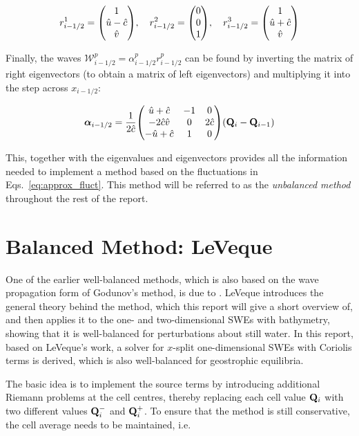 \begin{align}
  r_{i-1/2}^1 = \mqty(1 \\ \hat u - \hat c \\ \hat v) \qc
  r_{i-1/2}^2 = \mqty(0 \\ 0 \\ 1) \qc
  r_{i-1/2}^3 = \mqty(1 \\ \hat u + \hat c \\ \hat v)
\end{align}

Finally, the waves $\mathcal{W}_{i-1/2}^p = \alpha_{i-1/2}^p r_{i-1/2}^p$ can be found by inverting the matrix of right eigenvectors (to obtain a matrix of left eigenvectors) and multiplying it into the step across $x_{i-1/2}$:

\begin{equation}
  \vb*{\alpha}_{i-1/2} = \frac{1}{2\hat c}\mqty(
    \hat u + \hat c & -1 & 0 \\
    -2\hat c \hat v &  0 & 2\hat c \\
    -\hat u + \hat c & 1 & 0
  ) (\vb Q_i - \vb Q_{i-1})
\end{equation}

This, together with the eigenvalues and eigenvectors provides all the information needed to implement a method based on the fluctuations in Eqs.~\ref{eq:approx_fluct}. This method will be referred to as the \emph{unbalanced method} throughout the rest of the report.

\section{Balanced Method: LeVeque}

One of the earlier well-balanced methods, which is also based on the wave propagation form of Godunov's method, is due to \citet{leveque1998balancing}. LeVeque introduces the general theory behind the method, which this report will give a short overview of, and then applies it to the one- and two-dimensional SWEs with bathymetry, showing that it is well-balanced for perturbations about still water. In this report, based on LeVeque's work, a solver for $x$-split one-dimensional SWEs with Coriolis terms is derived, which is also well-balanced for geostrophic equilibria.

The basic idea is to implement the source terms by introducing additional Riemann problems at the cell centres, thereby replacing each cell value $\vb Q_i$ with two different values $\vb Q_i^-$ and $\vb Q_i^+$. To ensure that the method is still conservative, the cell average needs to be maintained, i.e.

